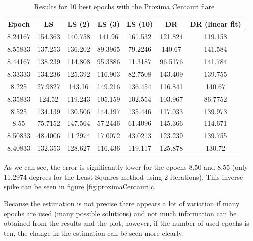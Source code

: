 \begin{table}[h!]
	\centering
	\def\arraystretch{1.2}
	\begin{tabular}{|c c c c c c c|} 
		\hline
		Epoch & LS & LS (2) & LS (3) & LS (10) & DR & DR (linear fit) \\ [0.5ex] 
		\hline\hline
		8.24167 & 154.363 & 140.758 & 141.96 & 161.532 & 121.824 & 119.158 \\
		\hline
		8.55833 & 137.253 & 136.202 & 89.3965 & 79.2246 & 140.67 & 141.584 \\
		\hline
		8.44167 & 138.239 & 114.808 & 95.3886 & 11.3187 & 96.5176 & 141.784 \\
		\hline
		8.33333 & 134.236 & 125.392 & 116.903 & 82.7508 & 143.409 & 139.755 \\
		\hline
		8.225 & 27.9827 & 143.16 & 149.216 & 136.454 & 116.841 & 140.67 \\
		\hline
		8.35833 & 124.52 & 119.243 & 105.159 & 102.554 & 103.967 & 86.7752 \\
		\hline
		8.525 & 134.139 & 130.506 & 144.197 & 135.446 & 117.033 & 139.973 \\
		\hline
		8.55 & 75.7152 & 147.564 & 57.2446 & 61.4096 & 145.366 & 114.671 \\
		\hline
		8.50833 & 48.4006 & 11.2974 & 17.0072 & 43.0213 & 123.239 & 139.755 \\
		\hline
		8.40833 & 132.353 & 128.627 & 116.436 & 119.117 & 125.878 & 130.72 \\
		\hline
	\end{tabular}
	\caption{Results for 10 best epochs with the Proxima Centauri flare}
	\label{tab:proximaTable}
\end{table}

\clearpage

As we can see, the error is significantly lower for the epochs 8.50 and 8.55 (only 11.2974 degrees for the Least Squares method using 2 iterations). This inverse spike can be seen in figure \ref{fig:proximaCentauri}c.

Because the estimation is not precise there appears a lot of variation if many epochs are used (many possible solutions) and not much information can be obtained from the results and the plot, however, if the number of used epochs is ten, the change in the estimation can be seen more clearly:


